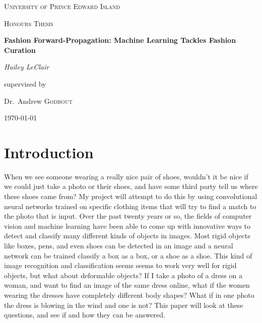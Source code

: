 \documentclass[12pt]{article} %
\begin{document}
\begin{titlepage}
\centering
    {\scshape\LARGE University of Prince Edward Island\par}
    \vspace{1cm}
    {\scshape\Large Honours Thesis\par}
    \vspace{1.5cm}
    {\huge\bfseries Fashion Forward-Propagation: Machine Learning Tackles Fashion Curation\par}
    \vspace{2cm}
    {\Large\itshape Hailey LeClair\par}
    \vfill
    supervised by\par
    Dr.~Andrew \textsc{Godbout}

\vfill

\today\par

\end{titlepage}


\section{Introduction}


	When we see someone wearing a really nice pair of shoes, wouldn't it be nice if we could just take a photo or their shoes, and have some third party tell us where these shoes came from? My project will attempt to do this by using convolutional neural networks trained on specific clothing items that will try to find a match to the photo that is input. Over the past twenty years or so, the fields of computer vision and machine learning have been able to come up with innovative ways to detect and classify many different kinds of objects in images. Most rigid objects like boxes, pens, and even shoes can be detected in an image and a neural network can be trained classify a box as a box, or a shoe as a shoe. This kind of image recognition and classification seems seems to work very well for rigid objects, but what about deformable objects? If I take a photo of a dress on a woman, and want to find an image of the same dress online, what if the women wearing the dresses have completely different body shapes? What if in one photo the dress is blowing in the wind and one is not? This paper will look at these questions, and see if and how they can be answered. 
	
\end{document}
